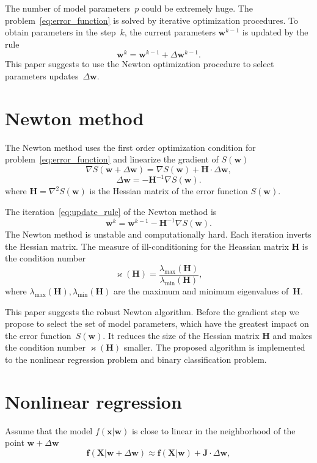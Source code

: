 \documentclass[a4paper,12pt]{article}
\renewcommand{\kappa}{\ensuremath{\varkappa}}
\theoremstyle{plain} %
\theoremstyle{definition} %
\theoremstyle{remark} %
\newcommand{\bw}{\mathbf{w}}
\newcommand{\bx}{\mathbf{x}}
\newcommand{\bJ}{\mathbf{J}}
\newcommand{\bH}{\mathbf{H}}
\newcommand{\bX}{\mathbf{X}}
\begin{document}
	The number of model parameters~$p$ could be extremely huge. 
	The problem~\eqref{eq:error_function} is solved by iterative optimization procedures. 
	To obtain parameters in the step~$k$, the current parameters $\bw^{k-1}$ is updated by the rule
	\begin{equation}
		\bw^k = \bw^{k - 1} + \Delta \bw^{k - 1}.
		\label{eq:update_rule}
	\end{equation}
	This paper suggests to use the Newton optimization procedure to select parameters updates~$\Delta \bw$.

	\section*{Newton method}
	
	The Newton method uses the first order optimization condition for problem~\eqref{eq:error_function} and linearize the gradient of $S(\bw)$
	\[
		\nabla S (\bw + \Delta \bw) = \nabla S(\bw) + \bH \cdot \Delta \bw,
	\]
	\[
		\Delta \bw = - \bH^{-1} \nabla S(\bw).
	\]
	where $\bH = \nabla^2 S(\bw)$ is the Hessian matrix of the error function $S(\bw)$.
	
	The iteration~\eqref{eq:update_rule} of the Newton method is
	\[
		\bw^k = \bw^{k-1} - \bH^{-1} \nabla S(\bw).
	\]
	The Newton method is unstable and computationally hard. Each iteration inverts the Hessian matrix.
	The measure of ill-conditioning for the Heassian matrix $\bH$ is the condition number
	\[
		\kappa(\bH) = \frac{\lambda_{\text{max}}(\bH)}{\lambda_{\text{min}}(\bH)},
	\]
	where $\lambda_{\text{max}}(\bH), \lambda_{\text{min}}(\bH)$ are the maximum and minimum eigenvalues of~$\bH$.
	
	This paper suggests the robust Newton algorithm. 
	Before the gradient step we propose to select the set of model parameters, which have the greatest impact on the error function~$S(\bw)$.
	It reduces the size of the Hessian matrix $\bH$ and makes the condition number $\kappa(\bH)$ smaller.
	The proposed algorithm is implemented to the nonlinear regression problem and binary classification problem.
	
	\section*{Nonlinear regression}
	Assume that the model $f(\bx | \bw)$ is close to linear in the neighborhood of the point $\bw + \Delta \bw$
	\[
	\mathbf{f}(\bX | \bw + \Delta \bw) \approx \mathbf{f}(\bX | \bw) + \bJ \cdot \Delta  \bw,
	\]
	
\end{document}
